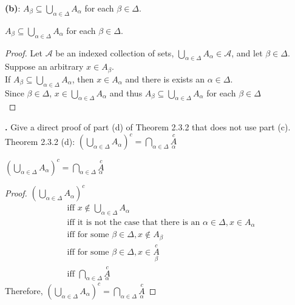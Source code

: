 \documentclass[a4paper,11pt]{article}
\begin{document}
\noindent \textbf{(b)}: \(A_{\beta} \subseteq \bigcup\limits_{\alpha \in \Delta}A_\alpha \) for each \(\beta \in 
\Delta\).
\begin{theorem2}
\(A_{\beta} \subseteq \bigcup\limits_{\alpha \in \Delta}A_\alpha \) for each \(\beta \in 
\Delta\).
\begin{proof}
  Let \(\mathscr{A}\) be an indexed collection of sets, \(\bigcup\limits_{\alpha \in \Delta}A_\alpha \in \mathscr{A}\), and let \(\beta \in \Delta\).\\
  Suppose an arbitrary \(x \in A_\beta\).\\
  If \(A_{\beta} \subseteq \bigcup\limits_{\alpha \in \Delta}A_\alpha \), then \(x \in A_\alpha\) 
  and there is exists an \(\alpha \in \Delta\).\\
  Since \(\beta \in \Delta\), \(x \in \bigcup\limits_{\alpha \in \Delta}A_\alpha\) and thus \(A_{\beta} \subseteq \bigcup\limits_{\alpha \in \Delta}A_\alpha \) for each \(\beta \in 
\Delta\)\\
\end{proof}
\end{theorem2}
\newpage
\noindent \setcounter{SubsectionCounter}{2}
\textbf{.}
Give a direct proof of part (d) of Theorem 2.3.2 that does not use part (c).\\
Theorem 2.3.2 (d): \(\left(\bigcup\limits_{\alpha \in \Delta}A_\alpha\right)^c = \bigcap\limits_{\alpha \in \Delta}A\limits_{\alpha}^c \)
\begin{theorem2}
  \(\left(\bigcup\limits_{\alpha \in \Delta}A_\alpha\right)^c = \bigcap\limits_{\alpha \in \Delta}A\limits_{\alpha}^c \)
  \begin{proof}
    \(\left(\bigcup\limits_{\alpha \in \Delta}A_\alpha\right)^c \)
    \begin{align*}
      &\text{iff } x \notin \bigcup\limits_{\alpha \in \Delta}A_\alpha\\
      &\text{iff it is not the case that there is an } \alpha \in \Delta, x \in A_\alpha\\
      &\text{iff for some } \beta \in \Delta, x \notin A_\beta\\
      &\text{iff for some } \beta \in \Delta, x \in A\limits_{\beta}^c\\
      &\text{iff } \bigcap\limits_{\alpha \in \Delta}A\limits_{\alpha}^c
    \end{align*}
    Therefore, \(\left(\bigcup\limits_{\alpha \in \Delta}A_\alpha\right)^c = \bigcap\limits_{\alpha \in \Delta}A\limits_{\alpha}^c \)
  \end{proof}
\end{theorem2}
\end{document}
